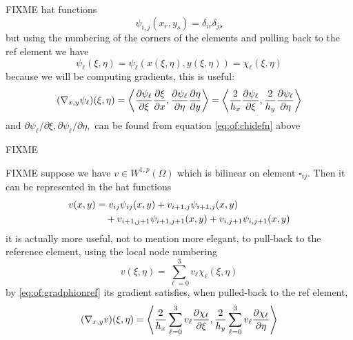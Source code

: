 FIXME hat functions
\begin{equation}
  \psi_{i,j}(x_r,y_s) = \delta_{ir} \delta_{js}  \label{eq:of:phinodewise}
\end{equation}
but using the numbering of the corners of the elements and pulling back to the ref element we have
\begin{equation}
  \psi_\ell(\xi,\eta) = \psi_\ell(x(\xi,\eta),y(\xi,\eta)) = \chi_\ell(\xi,\eta)  \label{eq:of:phionref}
\end{equation}
because we will be computing gradients, this is useful:
\begin{equation}
  (\nabla_{x,y} \psi_\ell)(\xi,\eta) = \left<\frac{\partial\psi_\ell}{\partial \xi} \frac{\partial\xi}{\partial x},\frac{\partial\psi_\ell}{\partial \eta} \frac{\partial\eta}{\partial y}\right> = \left<\frac{2}{h_x}\frac{\partial\psi_\ell}{\partial \xi},\frac{2}{h_y}\frac{\partial\psi_\ell}{\partial \eta}\right>   \label{eq:of:gradphionref}
\end{equation}
and $\partial\psi_\ell/\partial \xi,\partial\psi_\ell/\partial \eta,$ can be found from equation \eqref{eq:of:chidefn} above

\begin{marginfigure}

\caption{FIXME}
\label{fig:q1hat}
\end{marginfigure}

FIXME suppose we have $v \in W^{1,p}(\Omega)$ which is bilinear on element $\square_{ij}$.  Then it can be represented in the hat functions
\begin{align}
v(x,y) &= v_{ij} \psi_{ij}(x,y) + v_{i+1,j} \psi_{i+1,j}(x,y) \label{eq:of:bilinearrepresentation} \\
 &\quad + v_{i+1,j+1} \psi_{i+1,j+1}(x,y) + v_{i,j+1} \psi_{i,j+1}(x,y) \notag \end{align}
it is actually more useful, not to mention more elegant, to pull-back to the reference element, using the local node numbering
\begin{equation}
v(\xi,\eta) = \sum_{\ell=0}^3 v_\ell \chi_\ell(\xi,\eta)  \label{eq:of:bilinearrepresentationref}
\end{equation}
by \eqref{eq:of:gradphionref} its gradient satisfies, when pulled-back to the ref element,
\begin{equation}
  (\nabla_{x,y} v)(\xi,\eta) = \left<\frac{2}{h_x} \sum_{\ell=0}^3 v_\ell \frac{\partial\chi_\ell}{\partial \xi}, \frac{2}{h_y} \sum_{\ell=0}^3 v_\ell \frac{\partial\chi_\ell}{\partial \eta}\right> \label{eq:of:gradrepref}
\end{equation}


